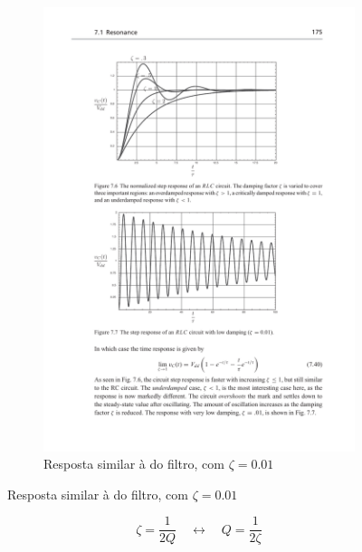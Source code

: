\begin{frame}[shrink]
\begin{figure}[H]
\begin{subfigure}[H]{.49\textwidth}
        \includegraphics[width=\textwidth]{fig/q-tempo-high.pdf}
        \caption{Resposta similar à do filtro, com $\zeta = 0.01$}
    \end{subfigure}
    \label{f-q-tempo}
\end{figure}

\begin{equation}
    \zeta = \frac{1}{2Q} \quad \longleftrightarrow \quad Q = \frac{1}{2\zeta}
\end{equation}
    
\end{frame}

